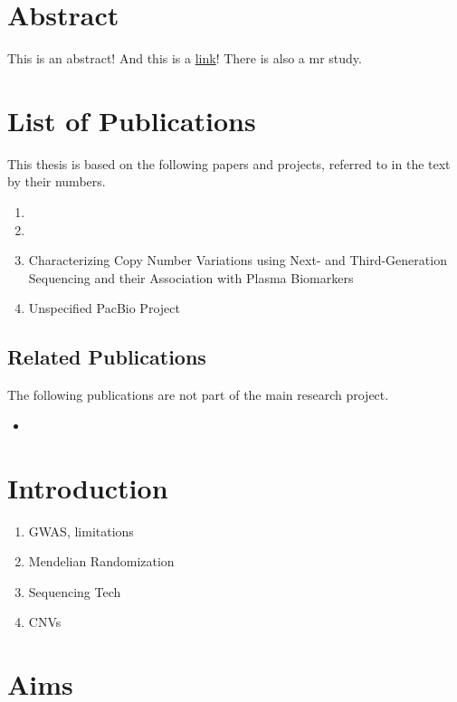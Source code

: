 \documentclass[draft]{scrbook}
\begin{document}
\chapter{Abstract}
    This is an abstract! And this is a \href{https://schmytzi.github.io/}{link}! There is also a \gls{mr} study.

\chapter{List of Publications}
This thesis is based on the following papers and projects, referred to in the text by their numbers.

\begin{enumerate}[label=\Roman*.]
    \item {}
    \item {}
    \item Characterizing Copy Number Variations using Next- and Third-Generation Sequencing and their Association with Plasma Biomarkers
    \item Unspecified PacBio Project
\end{enumerate}

\section*{Related Publications}
The following publications are not part of the main research project.
\begin{itemize}
    \item {}
\end{itemize}

\tableofcontents

\mainmatter
\glsresetall
\parskip 0pt
\parindent \oldparindent
\chapter{Introduction}
\begin{enumerate}
    \item GWAS, limitations
    \item Mendelian Randomization
    \item Sequencing Tech
    \item CNVs
\end{enumerate}
\chapter{Aims}
\end{document}
